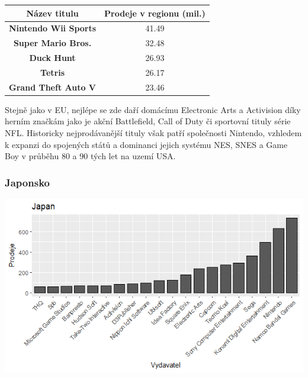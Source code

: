 \documentclass[a4paper,11pt]{article}
\begin{document}
\begin{center}
\begin{tabular}{|c|c|}
\hline
\textbf{Název titulu}       & \textbf{Prodeje v regionu (mil.)} \\ \hline
\textbf{Nintendo Wii Sports}         & 41.49                             \\ \hline
\textbf{Super Mario Bros.}  & 32.48                             \\ \hline
\textbf{Duck Hunt}          & 26.93                             \\ \hline
\textbf{Tetris}             & 26.17                             \\ \hline
\textbf{Grand Theft Auto V} & 23.46                             \\ \hline
\end{tabular}
\end{center}

Stejně jako v EU, nejlépe se zde daří domácímu Electronic Arts a Activision díky herním značkám jako je akční Battlefield, Call of Duty či sportovní tituly série NFL. Historicky nejprodávanější tituly však patří společnosti Nintendo, vzhledem k expanzi do spojených států a dominanci jejich systému NES, SNES a Game Boy v průběhu 80 a 90 tých let na uzemí USA.

\newpage

\subsubsection{Japonsko}
\includegraphics[scale=0.8]{Rplot12}
\end{document}
